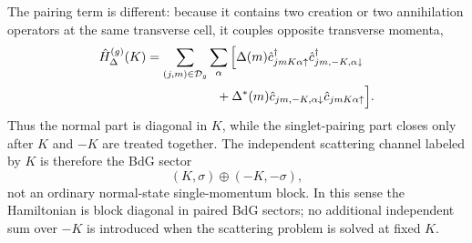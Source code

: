 The pairing term is different: because it contains two creation or two annihilation operators at the same transverse cell, it couples opposite transverse momenta,
\begin{align}
	\hat H_\Delta^{(g)}(K)
	 & =
	\sum_{(j,m)\in\mathcal D_g}
	\sum_\alpha
	\Big[
		\Delta(m)
		\hat c_{jmK\alpha\uparrow}^{\dagger}
		\hat c_{jm,-K,\alpha\downarrow}^{\dagger}
	\notag            \\
	 & \hspace{5.5em}
		+
		\Delta^*(m)
		\hat c_{jm,-K,\alpha\downarrow}
		\hat c_{jmK\alpha\uparrow}
		\Big].
	\label{eq:H-pair-K}
\end{align}
Thus the normal part is diagonal in $K$, while the singlet-pairing part closes only after $K$ and $-K$ are treated together.  The independent scattering channel labeled by $K$ is therefore the BdG sector
\begin{equation}
	(K,\sigma)\oplus(-K,-\sigma),
	\label{eq:paired-sector}
\end{equation}
not an ordinary normal-state single-momentum block.  In this sense the Hamiltonian is block diagonal in paired BdG sectors; no additional independent sum over $-K$ is introduced when the scattering problem is solved at fixed $K$.
